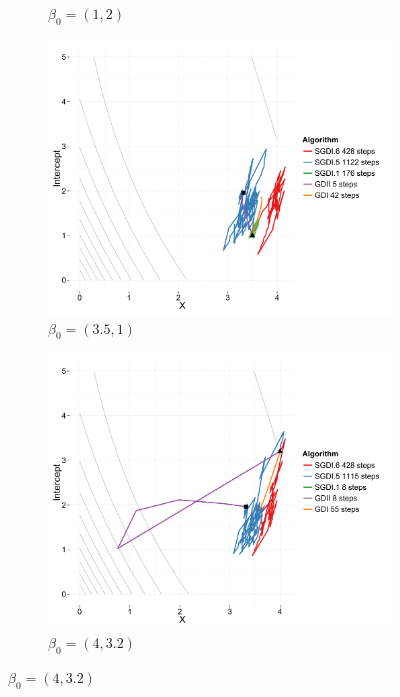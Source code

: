 \begin{figure}[h!]
\begin{center}
\begin{subfigure}[h!]{0.49\textwidth}
        \caption{$\beta_0 = (1,2)$}
      \end{subfigure}
   \begin{subfigure}[h!]{0.49\textwidth}
           \includegraphics[width=\textwidth]{Obrazki/contour_35_1.pdf}
           \caption{$\beta_0 = (3.5,1)$}
                 \end{subfigure}
   \begin{subfigure}[h!]{0.49\textwidth}
              \includegraphics[width=\textwidth]{Obrazki/contour_4_32.pdf}
              \caption{$\beta_0 = (4,3.2)$}
            \end{subfigure}

\end{center}
\end{figure}
